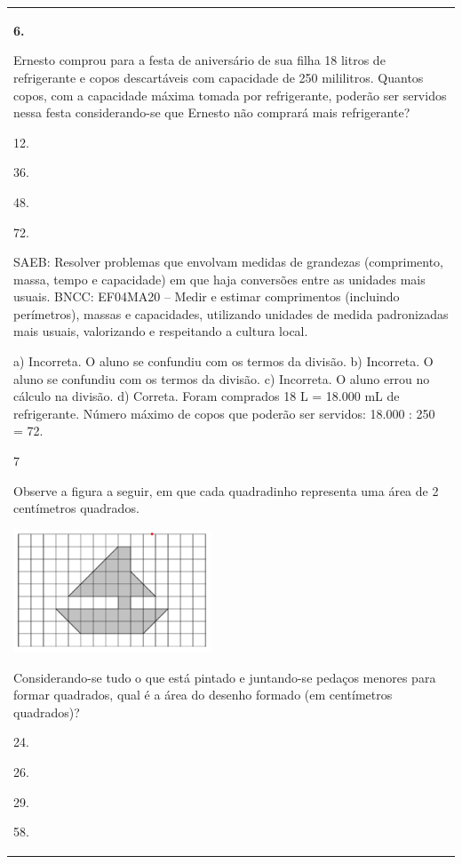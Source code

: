\begin{mdframed}[linewidth=2pt,linecolor=salmao,roundcorner=2pt]
\begin{escolha}
{{{\begin{longtable}[]{@{}l@{}}
\begin{itemize}
{\textbf{6.}

Ernesto comprou para a festa de aniversário de sua filha 18 litros de
refrigerante e copos descartáveis com capacidade de 250 mililitros.
Quantos copos, com a capacidade máxima tomada por refrigerante, poderão
ser servidos nessa festa considerando-se que Ernesto não comprará mais
refrigerante?

\begin{escolha}
\item
  12.
\item
  36.
\item
  48.
\item
  72.
\end{escolha}

SAEB: Resolver problemas que envolvam medidas de grandezas
(comprimento, massa, tempo e capacidade) em que haja conversões entre as
unidades mais usuais.
BNCC: EF04MA20 -- Medir e estimar comprimentos (incluindo perímetros), massas e capacidades, utilizando
unidades de medida padronizadas mais usuais, valorizando e respeitando a cultura local.

a) Incorreta. O aluno se confundiu com os termos da divisão.
b) Incorreta. O aluno se confundiu com os termos da divisão.
c) Incorreta. O aluno errou no cálculo na divisão.
d) Correta. Foram comprados 18 L = 18.000 mL de refrigerante.
Número máximo de copos que poderão ser servidos: 18.000 : 250 = 72.

\num{7}

Observe a figura a seguir, em que cada quadradinho representa uma área de 2 centímetros quadrados.

\includegraphics[width=2.32692in,height=1.43990in]{media/image144.png}

Considerando-se tudo o que está pintado e juntando-se pedaços
menores para formar quadrados, qual é a área do desenho formado (em centímetros quadrados)?

\begin{escolha}
\item
  24.
\item
  26.
\item
  29.
\item
  58.
\end{escolha}

}
\end{itemize}
\end{longtable}}}}
\end{escolha}
\end{mdframed}
